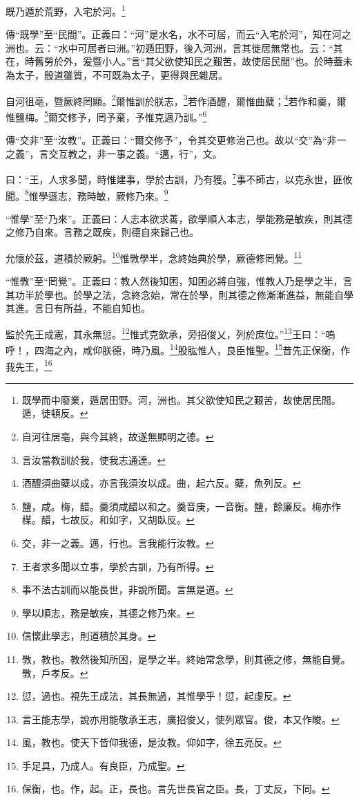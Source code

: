 既乃遁於荒野，入宅於河。\footnote{既學而中廢業，遁居田野。河，洲也。其父欲使知民之艱苦，故使居民間。遁，徒頓反。}

{\noindent\zhuan{}\fzbyks 傳“既學”至“民間”。正義曰：“河”是水名，水不可居，而云“入宅於河”，知在河之洲也。云：“水中可居者曰洲。”初遁田野，後入河洲，言其徙居無常也。云：“其在，時舊勞於外，爰暨小人。”言“其父欲使知民之艱苦，故使居民間”也。於時蓋未為太子，殷道雖質，不可既為太子，更得與民雜居。 \par}

自河徂亳，暨厥終罔顯。\footnote{自河往居亳，與今其終，故遂無顯明之德。}爾惟訓於朕志，\footnote{言汝當教訓於我，使我志通達。}若作酒醴，爾惟曲糵；\footnote{酒醴須曲糵以成，亦言我須汝以成。曲，起六反。糵，魚列反。}若作和羹，爾惟鹽梅。\footnote{鹽，咸。梅，醋。羹須咸醋以和之。羹音庚，一音衡。鹽，餘廉反。梅亦作楳。醋，七故反。和如字，又胡臥反。}爾交修予，罔予棄，予惟克邁乃訓。”\footnote{交，非一之義。邁，行也。言我能行汝教。}

{\noindent\zhuan{}\fzbyks 傳“交非”至“汝教”。正義曰：“爾交修予”，令其交更修治己也。故以“交”為“非一之義”，言交互教之，非一事之義。“邁，行”，文。 \par}

曰：“王，人求多聞，時惟建事，學於古訓，乃有獲。\footnote{王者求多聞以立事，學於古訓，乃有所得。}事不師古，以克永世，匪攸聞。\footnote{事不法古訓而以能長世，非說所聞。言無是道。}惟學遜志，務時敏，厥修乃來。\footnote{學以順志，務是敏疾，其德之修乃來。}

{\noindent\shu{}\fzkt “惟學”至“乃來”。正義曰：人志本欲求善，欲學順人本志，學能務是敏疾，則其德之修乃自來。言務之既疾，則德自來歸己也。 \par}

允懷於茲，道積於厥躬。\footnote{信懷此學志，則道積於其身。}惟斆學半，念終始典於學，厥德修罔覺。\footnote{斆，教也。教然後知所困，是學之半。終始常念學，則其德之修，無能自覺。斆，戶孝反。}

{\noindent\shu{}\fzkt “惟斆”至“罔覺”。正義曰：教人然後知困，知困必將自強，惟教人乃是學之半，言其功半於學也。於學之法，念終念始，常在於學，則其德之修漸漸進益，無能自學其進。言日有所益，不能自知也。 \par}

監於先王成憲，其永無愆。\footnote{愆，過也。視先王成法，其長無過，其惟學乎！愆，起虔反。}惟式克欽承，旁招俊乂，列於庶位。”\footnote{言王能志學，說亦用能敬承王志，廣招俊乂，使列眾官。俊，本又作畯。}王曰：“嗚呼！，四海之內，咸仰朕德，時乃風。\footnote{風，教也。使天下皆仰我德，是汝教。仰如字，徐五亮反。}股肱惟人，良臣惟聖。\footnote{手足具，乃成人。有良臣，乃成聖。}昔先正保衡，作我先王，\footnote{保衡，也。作，起。正，長也。言先世長官之臣。長，丁丈反，下同。}

